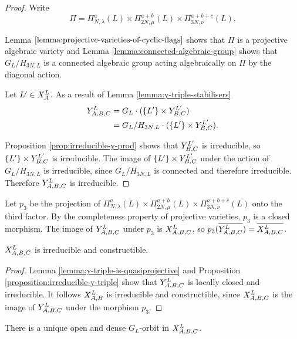 \documentclass[a4paper, 11pt]{report}
\begin{document}
\begin{proof}
Write
\begin{equation*}
\Pi=\Pi_{N,\lambda}^{a}(L)\times\Pi_{2N,\mu}^{a+b}(L)\times\Pi_{3N,\nu}^{a+b+c}(L).
\end{equation*}

Lemma $\ref{lemma:projective-varieties-of-cyclic-flags}$ shows that $\Pi$ is a projective algebraic variety and Lemma \ref{lemma:connected-algebraic-group} shows that $G_L/{H_{3N,L}}$ is a connected algebraic group acting algebraically on $\Pi$ by the diagonal action.

Let $L'\in\xprod[L]{A}$. As a result of Lemma \ref{lemma:y-triple-stabilisers} 
\begin{align*}
\yprod[L]{A,B,C}
&= G_L\cdot (\{L'\}\times\yprod[L']{B,C})\\
&= G_L/{H_{3N,L}}\cdot (\{L'\}\times\yprod[L']{B,C}).
\end{align*}

Proposition \ref{prop:irreducible-y-prod} shows that $\yprod[L']{B,C}$ is irreducible, so $\{L'\}\times\yprod[L']{B,C}$ is irreducible. The image of $\{L'\}\times\yprod[L']{B,C}$ under the action of $G_L/{H_{3N,L}}$ is irreducible, since $G_L/{H_{3N,L}}$ is connected and therefore irreducible. Therefore $\yprod[L]{A,B,C}$ is irreducible.
\end{proof}

Let $p_3$ be the projection of $\Pi_{N,\lambda}^a(L)\times\Pi_{2N,\mu}^{a+b}(L)\times\Pi_{3N,\nu}^{a+b+c}(L)$ onto the third factor. By the completeness property of projective varieties, $p_3$ is a closed morphism. The image of $\yprod[L]{A,B,C}$ under $p_3$ is $\xprod[L]{A,B,C}$, so $p_3(\overline{\yprod[L]{A,B,C}}) = \overline{\xprod[L]{A,B,C}}$.

\begin{lemma}\label{lemma:irreducible-x-triple}
$\xprod[L]{A,B,C}$ is irreducible and constructible.
\end{lemma}

\begin{proof}
Lemma \ref{lemma:y-triple-is-quasiprojective} and Proposition \ref{proposition:irreducible-y-triple} show that $\yprod[L]{A,B,C}$ is locally closed and irreducible. It follows $\xprod[L]{A,B}$ is irreducible and constructible, since $\xprod[L]{A,B,C}$ is the image of $\yprod[L]{A,B,C}$ under the morphism $p_3$.
\end{proof}

\begin{lemma}\label{lemma:generic-triple-product}
There is a unique open and dense $G_L$-orbit in $\xprod[L]{A,B,C}$.
\end{lemma}
\end{document}
